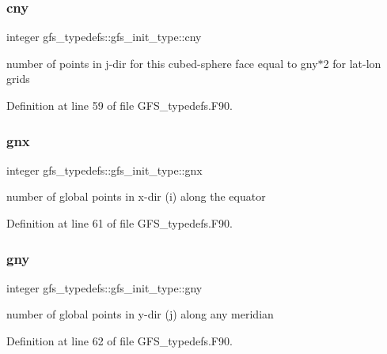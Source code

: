 \subsubsection{cny}
{\footnotesize\ttfamily integer gfs\+\_\+typedefs\+::gfs\+\_\+init\+\_\+type\+::cny}



number of points in j-\/dir for this cubed-\/sphere face equal to gny$\ast$2 for lat-\/lon grids 



Definition at line 59 of file G\+F\+S\+\_\+typedefs.\+F90.

\mbox{\label{structgfs__typedefs_1_1gfs__init__type_a32b73ea4f44c3198ab7ff182e6add889}} 
\subsubsection{gnx}
{\footnotesize\ttfamily integer gfs\+\_\+typedefs\+::gfs\+\_\+init\+\_\+type\+::gnx}



number of global points in x-\/dir (i) along the equator 



Definition at line 61 of file G\+F\+S\+\_\+typedefs.\+F90.

\mbox{\label{structgfs__typedefs_1_1gfs__init__type_adf8f5e3f24e2adb2034ddee6205f0f64}} 
\subsubsection{gny}
{\footnotesize\ttfamily integer gfs\+\_\+typedefs\+::gfs\+\_\+init\+\_\+type\+::gny}



number of global points in y-\/dir (j) along any meridian 



Definition at line 62 of file G\+F\+S\+\_\+typedefs.\+F90.

\mbox{\label{structgfs__typedefs_1_1gfs__init__type_ad0b005440fb988b4840957e2251750f8}} 
